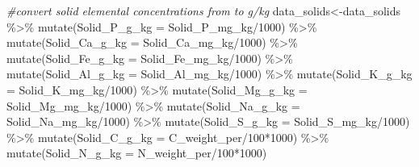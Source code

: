 \documentclass[
]{article}
\newenvironment{Shaded}{\begin{snugshade}}{\end{snugshade}}
\newcommand{\AttributeTok}[1]{\textcolor[rgb]{0.77,0.63,0.00}{#1}}
\newcommand{\CommentTok}[1]{\textcolor[rgb]{0.56,0.35,0.01}{\textit{#1}}}
\newcommand{\DecValTok}[1]{\textcolor[rgb]{0.00,0.00,0.81}{#1}}
\newcommand{\FunctionTok}[1]{\textcolor[rgb]{0.00,0.00,0.00}{#1}}
\newcommand{\NormalTok}[1]{#1}
\newcommand{\OtherTok}[1]{\textcolor[rgb]{0.56,0.35,0.01}{#1}}
\newcommand{\SpecialCharTok}[1]{\textcolor[rgb]{0.00,0.00,0.00}{#1}}
\begin{document}
\begin{Shaded}
\begin{Highlighting}[]
\CommentTok{\#convert solid elemental concentrations from to g/kg}
\NormalTok{data\_solids}\OtherTok{\textless{}{-}}\NormalTok{data\_solids }\SpecialCharTok{\%\textgreater{}\%}
  \FunctionTok{mutate}\NormalTok{(}\AttributeTok{Solid\_P\_g\_kg =}\NormalTok{ Solid\_P\_mg\_kg}\SpecialCharTok{/}\DecValTok{1000}\NormalTok{) }\SpecialCharTok{\%\textgreater{}\%}
  \FunctionTok{mutate}\NormalTok{(}\AttributeTok{Solid\_Ca\_g\_kg =}\NormalTok{ Solid\_Ca\_mg\_kg}\SpecialCharTok{/}\DecValTok{1000}\NormalTok{) }\SpecialCharTok{\%\textgreater{}\%}
  \FunctionTok{mutate}\NormalTok{(}\AttributeTok{Solid\_Fe\_g\_kg =}\NormalTok{ Solid\_Fe\_mg\_kg}\SpecialCharTok{/}\DecValTok{1000}\NormalTok{) }\SpecialCharTok{\%\textgreater{}\%}
  \FunctionTok{mutate}\NormalTok{(}\AttributeTok{Solid\_Al\_g\_kg =}\NormalTok{ Solid\_Al\_mg\_kg}\SpecialCharTok{/}\DecValTok{1000}\NormalTok{) }\SpecialCharTok{\%\textgreater{}\%}
  \FunctionTok{mutate}\NormalTok{(}\AttributeTok{Solid\_K\_g\_kg =}\NormalTok{ Solid\_K\_mg\_kg}\SpecialCharTok{/}\DecValTok{1000}\NormalTok{) }\SpecialCharTok{\%\textgreater{}\%}
  \FunctionTok{mutate}\NormalTok{(}\AttributeTok{Solid\_Mg\_g\_kg =}\NormalTok{ Solid\_Mg\_mg\_kg}\SpecialCharTok{/}\DecValTok{1000}\NormalTok{) }\SpecialCharTok{\%\textgreater{}\%}
  \FunctionTok{mutate}\NormalTok{(}\AttributeTok{Solid\_Na\_g\_kg =}\NormalTok{ Solid\_Na\_mg\_kg}\SpecialCharTok{/}\DecValTok{1000}\NormalTok{) }\SpecialCharTok{\%\textgreater{}\%}
  \FunctionTok{mutate}\NormalTok{(}\AttributeTok{Solid\_S\_g\_kg =}\NormalTok{ Solid\_S\_mg\_kg}\SpecialCharTok{/}\DecValTok{1000}\NormalTok{) }\SpecialCharTok{\%\textgreater{}\%}
  \FunctionTok{mutate}\NormalTok{(}\AttributeTok{Solid\_C\_g\_kg =}\NormalTok{ C\_weight\_per}\SpecialCharTok{/}\DecValTok{100}\SpecialCharTok{*}\DecValTok{1000}\NormalTok{) }\SpecialCharTok{\%\textgreater{}\%}
  \FunctionTok{mutate}\NormalTok{(}\AttributeTok{Solid\_N\_g\_kg =}\NormalTok{ N\_weight\_per}\SpecialCharTok{/}\DecValTok{100}\SpecialCharTok{*}\DecValTok{1000}\NormalTok{)}


\end{Highlighting}
\end{Shaded}
\end{document}

